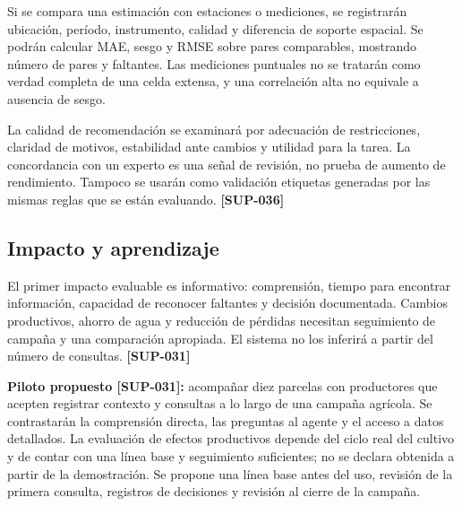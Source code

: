 \documentclass[10pt,a4paper]{article}
\begin{document}
Si se compara una estimación con estaciones o mediciones, se registrarán ubicación, período, instrumento, calidad y diferencia de soporte espacial. Se podrán calcular MAE, sesgo y RMSE sobre pares comparables, mostrando número de pares y faltantes. Las mediciones puntuales no se tratarán como verdad completa de una celda extensa, y una correlación alta no equivale a ausencia de sesgo.


La calidad de recomendación se examinará por adecuación de restricciones, claridad de motivos, estabilidad ante cambios y utilidad para la tarea. La concordancia con un experto es una señal de revisión, no prueba de aumento de rendimiento. Tampoco se usarán como validación etiquetas generadas por las mismas reglas que se están evaluando. \textbf{[SUP-036]}


\subsection{Impacto y aprendizaje}

El primer impacto evaluable es informativo: comprensión, tiempo para encontrar información, capacidad de reconocer faltantes y decisión documentada. Cambios productivos, ahorro de agua y reducción de pérdidas necesitan seguimiento de campaña y una comparación apropiada. El sistema no los inferirá a partir del número de consultas. \textbf{[SUP-031]}


\textbf{Piloto propuesto [SUP-031]:} acompañar diez parcelas con productores que acepten registrar contexto y consultas a lo largo de una campaña agrícola. Se contrastarán la comprensión directa, las preguntas al agente y el acceso a datos detallados. La evaluación de efectos productivos depende del ciclo real del cultivo y de contar con una línea base y seguimiento suficientes; no se declara obtenida a partir de la demostración. Se propone una línea base antes del uso, revisión de la primera consulta, registros de decisiones y revisión al cierre de la campaña.
\end{document}
